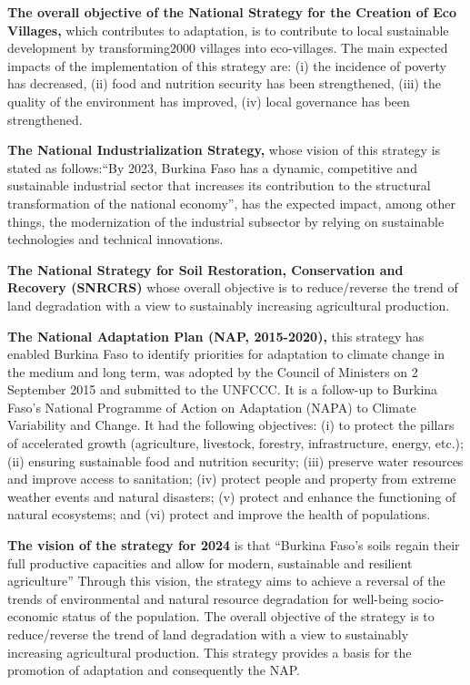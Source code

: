 \documentclass[
]{book}
\begin{document}
\textbf{The overall objective of the National Strategy for the Creation of Eco Villages,} which contributes to adaptation, is to contribute to local sustainable development by transforming2000 villages into eco-villages. The main expected impacts of the implementation of this strategy are: (i) the incidence of poverty has decreased, (ii) food and nutrition security has been strengthened, (iii) the quality of the environment has improved, (iv) local governance has been strengthened.

\textbf{The National Industrialization Strategy,} whose vision of this strategy is stated as follows:``By 2023, Burkina Faso has a dynamic, competitive and sustainable industrial sector that increases its contribution to the structural transformation of the national economy'', has the expected impact, among other things, the modernization of the industrial subsector by relying on sustainable technologies and technical innovations.

\textbf{The National Strategy for Soil Restoration, Conservation and Recovery (SNRCRS)} whose overall objective is to reduce/reverse the trend of land degradation with a view to sustainably increasing agricultural production.

\textbf{The National Adaptation Plan (NAP, 2015-2020),} this strategy has enabled Burkina Faso to identify priorities for adaptation to climate change in the medium and long term, was adopted by the Council of Ministers on 2 September 2015 and submitted to the UNFCCC. It is a follow-up to Burkina Faso's National Programme of Action on Adaptation (NAPA) to Climate Variability and Change. It had the following objectives: (i) to protect the pillars of accelerated growth (agriculture, livestock, forestry, infrastructure, energy, etc.); (ii) ensuring sustainable food and nutrition security; (iii) preserve water resources and improve access to sanitation; (iv) protect people and property from extreme weather events and natural disasters; (v) protect and enhance the functioning of natural ecosystems; and (vi) protect and improve the health of populations.

\textbf{The vision of the strategy for 2024} is that ``Burkina Faso's soils regain their full productive capacities and allow for modern, sustainable and resilient agriculture'' Through this vision, the strategy aims to achieve a reversal of the trends of environmental and natural resource degradation for well-being socio-economic status of the population. The overall objective of the strategy is to reduce/reverse the trend of land degradation with a view to sustainably increasing agricultural production. This strategy provides a basis for the promotion of adaptation and consequently the NAP.
\end{document}
